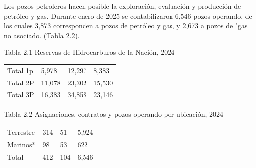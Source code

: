 \documentclass{sener2025}
\begin{document}
Los pozos petroleros hacen posible la exploración, evaluación y producción de petróleo y gas. Durante enero de 2025 se contabilizaron 6,546 pozos operando, de los cuales 3,873 corresponden a pozos de petróleo y gas, y 2,673 a pozos de "gas no asociado. (Tabla 2.2).

\begin{tabladoradoCorto}
  \caption{Tabla 2.1 Reservas de Hidrocarburos de la Nación, 2024}
  \label{tab:tabla_2_1_reservas_de_hidrocar}
  \begin{tabularx}{\textwidth}{Vvvv}
    \toprule
      &  &  &  \\
    \midrule
    Total 1p & 5,978 & 12,297 & 8,383 \\
    Total 2P & 11,078 & 23,302 & 15,530 \\
    Total 3P & 16,383 & 34,858 & 23,146 \\
    \bottomrule
  \end{tabularx}
\end{tabladoradoCorto}
\vspace{-4pt}

\begin{tabladoradoCorto}
  \caption{Tabla 2.2 Asignaciones, contratos y pozos operando por ubicación, 2024}
  \label{tab:tabla_2_2_asignaciones__contra}
  \begin{tabularx}{\textwidth}{Vvvv}
    \toprule
      &  &  &  \\
    \midrule
    Terrestre & 314 & 51 & 5,924 \\
    Marinos* & 98 & 53 & 622 \\
    Total & 412 & 104 & 6,546 \\
    \bottomrule
  \end{tabularx}
\end{tabladoradoCorto}
\vspace{-4pt}
\end{document}
